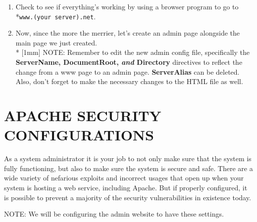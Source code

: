 \documentclass[11pt]{article}
\begin{document}
\begin{enumerate}
  \item Check to see if everything's working by using a browser program to go to \\*\verb|www.(your server).net|.

  \item Now, since the more the merrier, let's create an admin page alongside the main page we just created.
  \\* [1mm] NOTE: Remember to edit the new admin config file, specifically the \textbf{ServerName, DocumentRoot, \emph{and} Directory} directives to reflect the change from a www page to an admin page. \textbf{ServerAlias} can be deleted. Also, don't forget to make the necessary changes to the HTML file as well.
  
\end{enumerate}


\section*{APACHE SECURITY CONFIGURATIONS}

As a system administrator it is your job to not only make sure that the system is fully functioning, but also to make sure the system is secure and safe. There are a wide variety of nefarious exploits and incorrect usages that open up when your system is hosting a web service, including Apache. But if properly configured, it is possible to prevent a majority of the security vulnerabilities in existence today.

\vspace{5mm}

NOTE: We will be configuring the admin website to have these settings.
\end{document}
